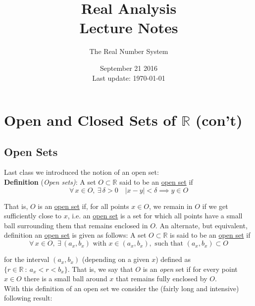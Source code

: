 \documentclass[12pt]{article}
\newlength\tindent
\renewcommand{\indent}{\hspace*{\tindent}}
\newcommand{\R}{\mathbb R}
\begin{document}
 
 
\title{Real Analysis\\Lecture Notes}
\author{The Real Number System}
\date{September 21 2016 \\ Last update: \today{}}
\maketitle

\section{Open and Closed Sets of $\bm{\R}$ (con't)}

\subsection{Open Sets}

Last class we introduced the notion of an open set: \\

%
%
{\bf Definition} {(\em Open sets)}: A set $O \subset \R$ said to be an \underline{open set} if 
\begin{equation*}
	\forall\,x\in O,~\exists\,\delta > 0 \quad |x - y| < \delta \implies y \in O
\end{equation*}

\indent That is, $O$ is an \underline{open set} if, for all points $x \in O$, we remain in $O$ if we get sufficiently close to $x$, i.e. an \underline{open set} is a set for which all points have a small ball surrounding them that remains enclosed in $O$. An alternate, but equivalent, definition an \underline{open set} is given as follows: A set $O \subset \R$ is said to be an \underline{open set} if 
\begin{equation*}
	\forall\,x\in O,~\exists\,(a_x, b_x) \text{ with } x \in (a_x, b_x), \text{ such that } (a_x, b_x) \subset O
\end{equation*}

for the interval $(a_x, b_x)$ (depending on a given $x$) defined as $\{r \in \R ~:~ a_x < r < b_x \}$. That is, we say that $O$ is an {\em open} set if for every point $x \in O$ there is a small ball around $x$ that remains fully enclosed by $O$. \\

With this definition of an open set we consider the (fairly long and intensive) following result: \\
\end{document}

